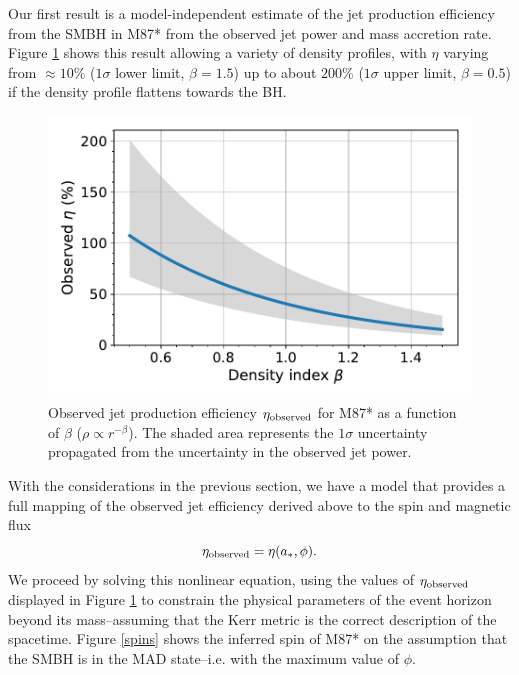 \documentclass[twocolumn]{aastex62} %
\begin{document}
Our first result is a model-independent estimate of the jet production efficiency from the SMBH in M87* from the observed jet power and mass accretion rate. Figure \ref{obs-eta} shows this result allowing a variety of density profiles, with $\eta$ varying from $\approx 10\%$ ($1\sigma$ lower limit, $\beta=1.5$) up to about $200\%$ ($1\sigma$ upper limit, $\beta=0.5$) if the density profile flattens towards the BH.

\begin{figure}[h]
\centering
\includegraphics[width=\linewidth]{figures/observed-eta.pdf}
\caption{Observed jet production efficiency $\eta_{\rm observed}$ for M87* as a function of $\beta$ ($\rho \propto r^{-\beta}$). The shaded area represents the $1\sigma$ uncertainty propagated from the uncertainty in the observed jet power. }
\label{obs-eta}
\end{figure}

With the considerations in the previous section, we have a model that provides a full mapping of the observed jet efficiency derived above to the spin and magnetic flux 
\begin{equation}    \label{eq}
\eta_{\rm observed}=\eta(a_*, \phi).
\end{equation}
We proceed by solving this nonlinear equation, using the values of $\eta_{\rm observed}$ displayed in Figure \ref{obs-eta} to constrain the physical parameters of the event horizon beyond its mass--assuming that the Kerr metric is the correct description of the spacetime. Figure \ref{spins} shows the inferred spin of M87* on the assumption that the SMBH is in the MAD state--i.e. with the maximum value of $\phi$. 
\end{document}
